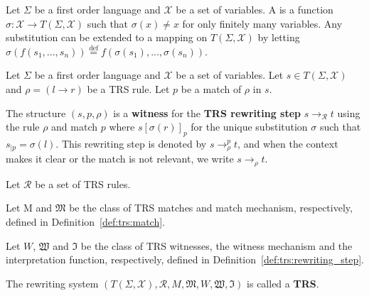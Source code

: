   \begin{definition}[Substitution]
    Let $\Sigma$ be a first order language and $\mathcal{X}$ be a set of variables.
    A  is a function $\sigma : \mathcal{X} \rightarrow T(\Sigma, \mathcal{X})$ such that $\sigma(x) \not = x$ for only finitely many variables. Any substitution can be extended to a mapping on $T(\Sigma,\mathcal{X})$ by letting $\sigma(f(s_1,...,s_n)) \overset{\operatorname{def}}{=}f(\sigma(s_1),...,\sigma(s_n))$.
  \end{definition}

   
  \begin{definition}
    \label{def:trs:rewriting_step}
    Let $\Sigma$ be a first order language and $\mathcal{X}$ be a set of variables. Let $s \in T(\Sigma, \mathcal{X})$ and $\rho = (l \to r)$ be a TRS rule. Let $p$ be a match of $\rho$ in $s$.

    The structure $(s, p, \rho)$ is a \textbf{witness} for the \textbf{TRS rewriting step} $s \to_\mathcal{R} t$ using the rule $\rho$ and match $p$
     where $s[\sigma(r)]_p$ for the unique substitution $\sigma$ such that $s_{|p} = \sigma(l)$. This rewriting step is denoted by $s \to^p_\rho t$, and when the context makes it clear or the match is not relevant, we write $s \to_\rho t$.
  \end{definition}
  
  \begin{definition}
    Let $\mathcal{R}$ be a set of TRS rules. 

    Let M and $\mathfrak{M}$ be the class of TRS matches and match mechanism, respectively, defined in Definition~\ref{def:trs:match}. 

    Let $W$, $\mathfrak{W}$ and $\mathfrak{I}$ be the class of TRS witnesses, the witness mechanism and the interpretation function, respectively, defined in Definition~\ref{def:trs:rewriting_step}.

    The rewriting system $(T(\Sigma,\mathcal{X}), \mathcal{R}, M, \mathfrak{M}, W, \mathfrak{W}, \mathfrak{I})$ is called a \textbf{TRS}.
  \end{definition}

